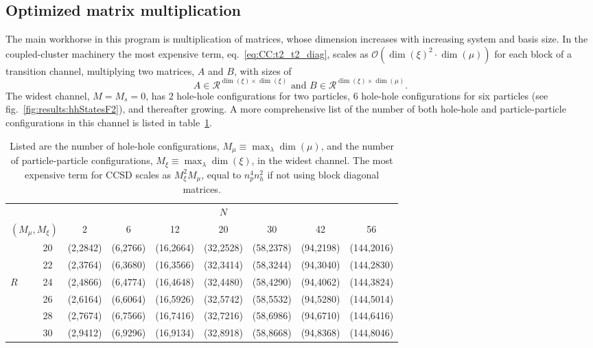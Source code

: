 \subsection{Optimized matrix multiplication}
The main workhorse in this program is multiplication of matrices, whose dimension increases with increasing system and basis size.
In the coupled-cluster machinery the most expensive term, eq.~\eqref{eq:CC:t2_t2_diag}, scales as $ \mathcal{O}\left(
\dim(\xi)^2 \cdot \dim(\mu)
\right) $
for each block of a transition channel, multiplying two matrices, $A$ and $B$, with sizes of
\begin{equation}
\label{eq:results:ABsize}
A \in \mathcal{R}^{\dim(\xi)\times\dim(\xi)} \textrm{ and } B \in \mathcal{R}^{\dim(\xi) \times \dim(\mu)}.
\end{equation}
The widest channel, $M=M_s = 0$, has 2 hole-hole configurations for two particles, 6 hole-hole configurations for six particles (see fig.~\ref{fig:results:hhStatesF2}), and thereafter growing.
A more comprehensive list of the number of both hole-hole and particle-particle configurations in this channel is listed in table~\ref{tab:results:dimConfig0}.
\begin{table}
\begin{center}
\caption{Listed are the number of hole-hole configurations, $M_{\mu} \equiv \max_{\lambda}\dim(\mu)$, and the number of particle-particle configurations, $M_{\xi} \equiv \max_{\lambda}\dim(\xi)$, in the widest channel. The most expensive term for CCSD scales as $M_{\xi}^2 M_{\mu}$, equal to $n_p^4 n_h^2$ if not using block diagonal matrices.}
\label{tab:results:dimConfig0}
\begin{tabular}{lc|ccccccc}
& &   &   &    & $N$ &    &    &   \\
\multicolumn{2}{c|}{$(M_{\mu},M_{\xi})$} & 2 & 6 & 12 & 20  & 30 & 42 & 56 \\
\hline \hline
&20 & (2,2842) & (6,2766) & (16,2664) & (32,2528) & (58,2378) & (94,2198) & (144,2016)  \\
&22 & (2,3764) & (6,3680) & (16,3566) & (32,3414) & (58,3244) & (94,3040) & (144,2830)  \\
\multirow{2}{*}{$ R $} &24 & (2,4866) & (6,4774) & (16,4648) & (32,4480) & (58,4290) & (94,4062) & (144,3824)  \\
&26 & (2,6164) & (6,6064) & (16,5926) & (32,5742) & (58,5532) & (94,5280) & (144,5014)  \\
&28 & (2,7674) & (6,7566) & (16,7416) & (32,7216) & (58,6986) & (94,6710) & (144,6416)  \\
&30 & (2,9412) & (6,9296) & (16,9134) & (32,8918) & (58,8668) & (94,8368) & (144,8046)  \\
\hline \hline
\end{tabular}
\end{center}
\end{table}

